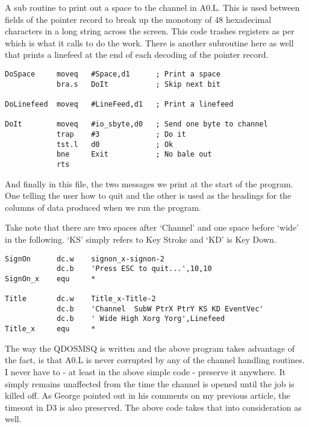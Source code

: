 A sub routine to print out a space to the channel in A0.L. This is used between fields of
the pointer record to break up the monotony of 48 hexadecimal characters in a long string
across the screen. This code trashes registers as per  which is what it calls to
do the work. There is another subroutine here as well that prints a linefeed at the end of
each decoding of the pointer record.

\begin{lstlisting}[firstnumber=last,caption={Pointer Record Examiner - Print a Space}]
DoSpace     moveq   #Space,d1      ; Print a space
            bra.s   DoIt           ; Skip next bit

DoLinefeed  moveq   #LineFeed,d1   ; Print a linefeed

DoIt        moveq   #io_sbyte,d0   ; Send one byte to channel
            trap    #3             ; Do it
            tst.l   d0             ; Ok
            bne     Exit           ; No bale out
            rts
\end{lstlisting}

And finally in this file, the two messages we print at the start of the program. One
telling the user how to quit and the other is used as the headings for the columns of data
produced when we run the program.

Take note that there are two spaces after `Channel' and one space before `wide' in the
following. `KS' simply refers to Key Stroke and `KD' is Key Down.

\begin{lstlisting}[firstnumber=last,caption={Pointer Record Examiner - Messages}]
SignOn      dc.w    signon_x-signon-2
            dc.b    'Press ESC to quit...',10,10
SignOn_x    equ     *

Title       dc.w    Title_x-Title-2
            dc.b    'Channel  SubW PtrX PtrY KS KD EventVec'
            dc.b    ' Wide High Xorg Yorg',Linefeed
Title_x     equ     *
\end{lstlisting}

The way the QDOSMSQ is written and the above program takes advantage of the fact, is that
A0.L is never corrupted by any of the channel handling routines. I never have to -{} at
least in the above simple code -{} preserve it anywhere. It simply remains unaffected from
the time the channel is opened until the job is killed off. As George pointed out in his
comments on my previous article, the timeout in D3 is also preserved. The above code takes
that into consideration as well.

